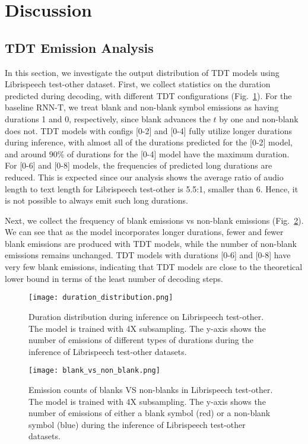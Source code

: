 \documentclass{article}
\begin{document}
\section{Discussion}\label{analysis}









\subsection{TDT Emission Analysis}
In this section, we investigate the output distribution of TDT models using Librispeech test-other dataset. 
First, we collect statistics on the duration predicted during decoding, with different TDT configurations (Fig.~\ref{fig:distribution}). For the baseline RNN-T, we treat blank and non-blank symbol emissions as having durations 1 and 0, respectively, since blank advances the $t$ by one and non-blank does not. TDT models with configs [0-2] and [0-4] fully utilize longer durations during inference, with almost all of the durations predicted for the [0-2] model, and around 90\% of durations for the [0-4] model have the maximum duration.
For [0-6] and [0-8] models, the frequencies of  predicted long durations are reduced. This is expected since our analysis shows the average ratio of audio length to text length for Librispeech test-other is 5.5:1, smaller than 6.  Hence, it is not possible to always emit such long durations.

Next, we collect the frequency of blank emissions vs non-blank emissions (Fig.~\ref{blank_vs_nonblank}). We can see that as the model incorporates longer durations, fewer and fewer blank emissions are produced with TDT models, while the number of non-blank emissions remains unchanged. TDT models with durations [0-6] and [0-8] have very few blank emissions, indicating that TDT models are close to  the theoretical lower bound in terms of the least number of decoding steps. 

\begin{figure}[t]
    \centering
    \texttt{[image: duration\_distribution.png]}
    \caption{Duration distribution during inference on Librispeech test-other. The model is trained with 4X subsampling. The y-axis shows the number of emissions of different types of durations during the inference of Librispeech test-other datasets.}
    \label{fig:distribution}
\end{figure}
\begin{figure}[t]
    \centering
    \texttt{[image: blank\_vs\_non\_blank.png]}
    \caption{Emission counts of blanks VS non-blanks in Librispeech test-other. The model is trained with 4X subsampling. The y-axis shows the number of emissions of either a blank symbol (red) or a non-blank symbol (blue) during the inference of Librispeech test-other datasets.}
    \label{blank_vs_nonblank}
\end{figure}
\end{document}
